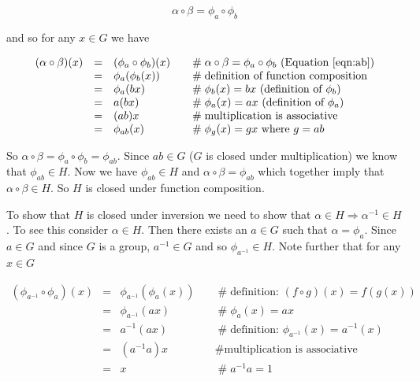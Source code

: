 \documentclass{article}
\theoremstyle{definition}
\begin{document}
\begin{equation}
\alpha \circ \beta = \phi_a \circ \phi_b
\label{eqn:ab}
\end{equation}
 
\bigskip
\noindent
and so for any $x \in G$ we have

\bigskip
\begin{equation}
\begin{array}{rcll}
(\alpha \circ \beta)(x)  
&=& (\phi_a \circ \phi_b)(x)                &\quad  \mathrel{\#}  \alpha \circ \beta = \phi_a \circ \phi_b \text{ (Equation \ref{eqn:ab})} \\
&=& \phi_{a}(\phi_{b}(x))                    &\quad  \mathrel{\#} \text{definition of function composition}          \\
&=& \phi_{a}(bx)                                 &\quad  \mathrel{\#} \phi_b(x) = bx \text{ (definition of $\phi_b$)}  \\
&=& a(bx)                                           &\quad  \mathrel{\#} \phi_a(x) = ax \text{ (definition of $\phi_a$)}  \\
&=& (ab)x                                           &\quad  \mathrel{\#} \text{multiplication is associative}                 \\
&=& \phi_{ab}(x)                                 &\quad  \mathrel{\#} \phi_{g}(x) =gx  \text{ where $g=ab$}
\end{array}
\label{eqn:function_composition}
\end{equation}

\bigskip
\noindent
So $\alpha \circ \beta = \phi_a \circ \phi_b = \phi_{ab}$. Since $ab \in G$ ($G$ is closed under multiplication) we know that $\phi_{ab} \in H$. Now
we have $\phi_{ab} \in H$ and $\alpha \circ \beta = \phi_{ab}$ which together imply that  $\alpha \circ \beta \in H$. So $H$ is closed under function composition.

\bigskip
\noindent
To show that $H$ is closed under inversion we need to show that $\alpha \in H \Rightarrow \alpha^{-1} \in H$.
To see this consider $\alpha \in H$.  Then there exists an $a \in G$ such that $\alpha = \phi_a$. 
Since $a \in G$ and since $G$ is a group, $a^{-1} \in G$ and so $\phi_{a^{-1}} \in H$. Note further that for any $x \in G$

\bigskip
\begin{equation}
\begin{array}{rcll}
(\phi_{a^{-1}} \circ \phi_a)(x)
&=& \phi_{a^{-1}}(\phi_a(x))        &\quad  \mathrel{\#} \text{definition: $(f \circ g)(x) = f(g(x))$}        \\
&=& \phi_{a^{-1}}(ax)                   &\quad  \mathrel{\#} \phi_a(x) = ax                                                \\
&=& a^{-1}(ax)                             &\quad  \mathrel{\#} \text{definition: } \phi_{a^{-1}}(x) = a^{-1}(x)  \\
&=& (a^{-1}a)x                             &\quad  \mathrel{\#} \text{multiplication is associative}                  \\
&=& x                                           &\quad  \mathrel{\#} a^{-1}a = 1
\end{array}
\label{eqn:comp1}
\end{equation}
\end{document}
